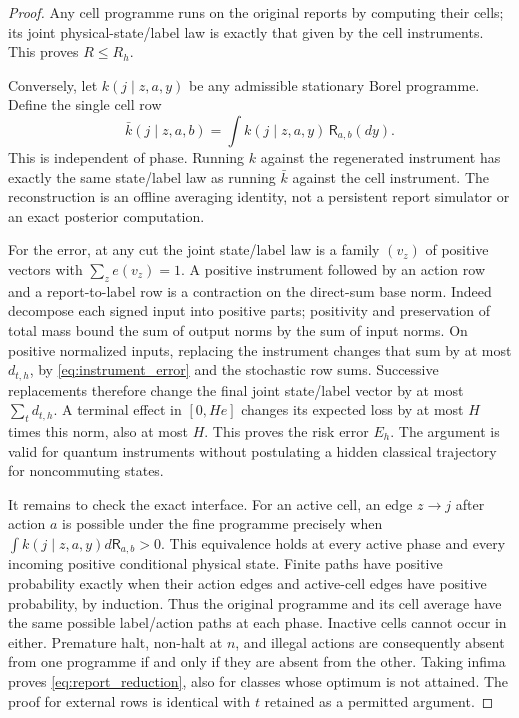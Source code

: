 \begin{proof}
Any cell programme runs on the original reports by computing their cells; its joint physical-state/label law is exactly that given by the cell instruments. This proves $R\le R_h$.

Conversely, let $k(j\mid z,a,y)$ be any admissible stationary Borel programme. Define the single cell row
\[
 \bar k(j\mid z,a,b)=\int k(j\mid z,a,y)\,\mathsf R_{a,b}(dy).
\]
This is independent of phase. Running $k$ against the regenerated instrument has exactly the same state/label law as running $\bar k$ against the cell instrument. The reconstruction is an offline averaging identity, not a persistent report simulator or an exact posterior computation.

For the error, at any cut the joint state/label law is a family $(v_z)$ of positive vectors with $\sum_z e(v_z)=1$. A positive instrument followed by an action row and a report-to-label row is a contraction on the direct-sum base norm. Indeed decompose each signed input into positive parts; positivity and preservation of total mass bound the sum of output norms by the sum of input norms. On positive normalized inputs, replacing the instrument changes that sum by at most $d_{t,h}$, by \eqref{eq:instrument_error} and the stochastic row sums. Successive replacements therefore change the final joint state/label vector by at most $\sum_t d_{t,h}$. A terminal effect in $[0,He]$ changes its expected loss by at most $H$ times this norm, also at most $H$. This proves the risk error $E_h$. The argument is valid for quantum instruments without postulating a hidden classical trajectory for noncommuting states.

It remains to check the exact interface. For an active cell, an edge $z\to j$ after action $a$ is possible under the fine programme precisely when $\int k(j\mid z,a,y)d\mathsf R_{a,b}>0$. This equivalence holds at every active phase and every incoming positive conditional physical state. Finite paths have positive probability exactly when their action edges and active-cell edges have positive probability, by induction. Thus the original programme and its cell average have the same possible label/action paths at each phase. Inactive cells cannot occur in either. Premature halt, non-halt at $n$, and illegal actions are consequently absent from one programme if and only if they are absent from the other. Taking infima proves \eqref{eq:report_reduction}, also for classes whose optimum is not attained. The proof for external rows is identical with $t$ retained as a permitted argument.
\end{proof}


